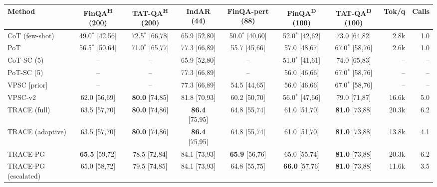 \begin{tabular}{lccccccrr}
\toprule
Method & FinQA\textsuperscript{H} (200) & TAT-QA\textsuperscript{H} (200) & IndAR (44) & FinQA-pert (88) & FinQA\textsuperscript{D} (100) & TAT-QA\textsuperscript{D} (100) & Tok/q & Calls \\
\midrule
CoT (few-shot) & 49.0$^{\ast}$ {\scriptsize[42,56]} & 72.5$^{\ast}$ {\scriptsize[66,78]} & 65.9 {\scriptsize[52,80]} & 50.0$^{\ast}$ {\scriptsize[40,60]} & 52.0$^{\ast}$ {\scriptsize[42,62]} & 73.0 {\scriptsize[64,82]} & 2.8k & 1.0 \\
PoT & 56.5$^{\ast}$ {\scriptsize[50,64]} & 71.0$^{\ast}$ {\scriptsize[65,77]} & 77.3 {\scriptsize[66,89]} & 55.7 {\scriptsize[45,66]} & 57.0 {\scriptsize[48,67]} & 67.0$^{\ast}$ {\scriptsize[58,76]} & 2.6k & 1.0 \\
CoT-SC (5) & -- & -- & 65.9 {\scriptsize[52,80]} & -- & 51.0$^{\ast}$ {\scriptsize[41,61]} & 74.0 {\scriptsize[65,83]} & -- & -- \\
PoT-SC (5) & -- & -- & 77.3 {\scriptsize[66,89]} & -- & 56.0 {\scriptsize[46,66]} & 67.0$^{\ast}$ {\scriptsize[58,76]} & -- & -- \\
VPSC [prior] & -- & -- & 77.3 {\scriptsize[66,89]} & 54.5 {\scriptsize[44,65]} & 56.0 {\scriptsize[46,66]} & 67.0$^{\ast}$ {\scriptsize[58,76]} & -- & -- \\
VPSC-v2 & 62.0 {\scriptsize[56,69]} & \textbf{80.0} {\scriptsize[74,85]} & 81.8 {\scriptsize[70,93]} & 60.2 {\scriptsize[50,70]} & 56.0$^{\ast}$ {\scriptsize[47,66]} & 79.0 {\scriptsize[71,87]} & 16.6k & 5.0 \\
\midrule
TRACE (full) & 63.5 {\scriptsize[57,70]} & \textbf{80.0} {\scriptsize[74,86]} & \textbf{86.4} {\scriptsize[75,95]} & 64.8 {\scriptsize[55,74]} & 61.0 {\scriptsize[51,70]} & \textbf{81.0} {\scriptsize[73,88]} & 20.3k & 6.2 \\
TRACE (adaptive) & 63.5 {\scriptsize[57,70]} & \textbf{80.0} {\scriptsize[74,86]} & \textbf{86.4} {\scriptsize[75,95]} & 64.8 {\scriptsize[55,74]} & 61.0 {\scriptsize[51,70]} & \textbf{81.0} {\scriptsize[73,88]} & 13.8k & 4.1 \\
\midrule
TRACE-PG & \textbf{65.5} {\scriptsize[59,72]} & 78.5 {\scriptsize[72,84]} & 84.1 {\scriptsize[73,93]} & \textbf{65.9} {\scriptsize[56,76]} & 65.0 {\scriptsize[55,74]} & \textbf{81.0} {\scriptsize[73,88]} & 20.3k & 6.2 \\
TRACE-PG (escalated) & 65.0 {\scriptsize[58,72]} & 79.5 {\scriptsize[74,85]} & 84.1 {\scriptsize[73,93]} & 64.8 {\scriptsize[55,75]} & \textbf{66.0} {\scriptsize[57,76]} & \textbf{81.0} {\scriptsize[73,88]} & 11.6k & 3.5 \\
\bottomrule
\end{tabular}
